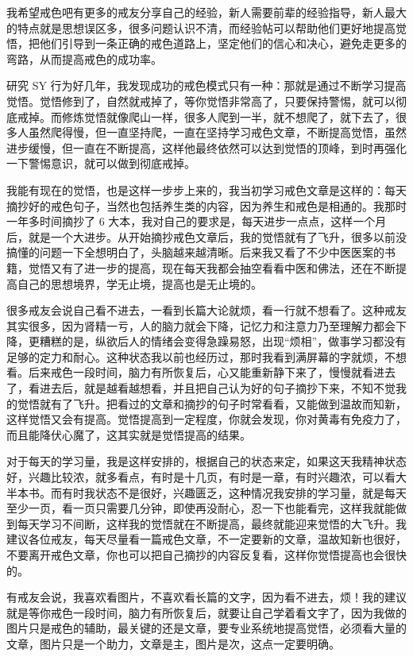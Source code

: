 \documentclass{ctexart}
\begin{document}
我希望戒色吧有更多的戒友分享自己的经验，新人需要前辈的经验指导，新人最大的特点就是思想误区多，很多问题认识不清，而经验帖可以帮助他们更好地提高觉悟，把他们引导到一条正确的戒色道路上，坚定他们的信心和决心，避免走更多的弯路，从而提高戒色的成功率。

研究 SY 行为好几年，我发现成功的戒色模式只有一种：那就是通过不断学习提高觉悟。觉悟修到了，自然就戒掉了，等你觉悟非常高了，只要保持警惕，就可以彻底戒掉。而修炼觉悟就像爬山一样，很多人爬到一半，就不想爬了，就下去了，很多人虽然爬得慢，但一直坚持爬，一直在坚持学习戒色文章，不断提高觉悟，虽然进步缓慢，但一直在不断提高，这样他最终依然可以达到觉悟的顶峰，到时再强化一下警惕意识，就可以做到彻底戒掉。

我能有现在的觉悟，也是这样一步步上来的，我当初学习戒色文章是这样的：每天摘抄好的戒色句子，当然也包括养生类的内容，因为养生和戒色是相通的。我那时一年多时间摘抄了 6 大本，我对自己的要求是，每天进步一点点，这样一个月后，就是一个大进步。从开始摘抄戒色文章后，我的觉悟就有了飞升，很多以前没搞懂的问题一下全想明白了，头脑越来越清晰。后来我又看了不少中医医案的书籍，觉悟又有了进一步的提高，现在每天我都会抽空看看中医和佛法，还在不断提高自己的思想境界，学无止境，提高也是无止境的。

很多戒友会说自己看不进去，一看到长篇大论就烦，看一行就不想看了。这种戒友其实很多，因为肾精一亏，人的脑力就会下降，记忆力和注意力乃至理解力都会下降，更糟糕的是，纵欲后人的情绪会变得急躁易怒，出现“烦相”，做事学习都没有足够的定力和耐心。这种状态我以前也经历过，那时我看到满屏幕的字就烦，不想看。后来戒色一段时间，脑力有所恢复后，心又能重新静下来了，慢慢就看进去了，看进去后，就是越看越想看，并且把自己认为好的句子摘抄下来，不知不觉我的觉悟就有了飞升。把看过的文章和摘抄的句子时常看看，又能做到温故而知新，这样觉悟又会有提高。觉悟提高到一定程度，你就会发现，你对黄毒有免疫力了，而且能降伏心魔了，这其实就是觉悟提高的结果。

对于每天的学习量，我是这样安排的，根据自己的状态来定，如果这天我精神状态好，兴趣比较浓，就多看点，有时是十几页，有时是一章，有时兴趣浓，可以看大半本书。而有时我状态不是很好，兴趣匮乏，这种情况我安排的学习量，就是每天至少一页，看一页只需要几分钟，即使再没耐心，忍一下也能看完，这样我就能做到每天学习不间断，这样我的觉悟就在不断提高，最终就能迎来觉悟的大飞升。我建议各位戒友，每天尽量看一篇戒色文章，不一定要新的文章，温故知新也很好，不要离开戒色文章，你也可以把自己摘抄的内容反复看，这样你觉悟提高也会很快的。

有戒友会说，我喜欢看图片，不喜欢看长篇的文字，因为看不进去，烦！我的建议就是等你戒色一段时间，脑力有所恢复后，就要让自己学着看文字了，因为我做的图片只是戒色的辅助，最关键的还是文章，要专业系统地提高觉悟，必须看大量的文章，图片只是一个助力，文章是主，图片是次，这点一定要明确。
\end{document}
